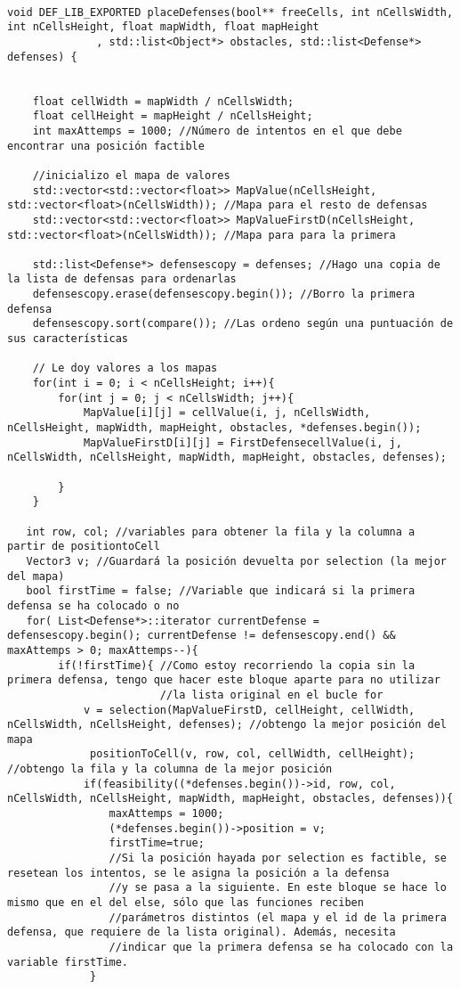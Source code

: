 \begin{lstlisting}

void DEF_LIB_EXPORTED placeDefenses(bool** freeCells, int nCellsWidth, int nCellsHeight, float mapWidth, float mapHeight
              , std::list<Object*> obstacles, std::list<Defense*> defenses) {

   
    float cellWidth = mapWidth / nCellsWidth;
    float cellHeight = mapHeight / nCellsHeight; 
    int maxAttemps = 1000; //Número de intentos en el que debe encontrar una posición factible
   
    //inicializo el mapa de valores
    std::vector<std::vector<float>> MapValue(nCellsHeight, std::vector<float>(nCellsWidth)); //Mapa para el resto de defensas
    std::vector<std::vector<float>> MapValueFirstD(nCellsHeight, std::vector<float>(nCellsWidth)); //Mapa para para la primera

    std::list<Defense*> defensescopy = defenses; //Hago una copia de la lista de defensas para ordenarlas
    defensescopy.erase(defensescopy.begin()); //Borro la primera defensa
    defensescopy.sort(compare()); //Las ordeno según una puntuación de sus características

    // Le doy valores a los mapas
    for(int i = 0; i < nCellsHeight; i++){
        for(int j = 0; j < nCellsWidth; j++){
            MapValue[i][j] = cellValue(i, j, nCellsWidth, nCellsHeight, mapWidth, mapHeight, obstacles, *defenses.begin());
            MapValueFirstD[i][j] = FirstDefensecellValue(i, j, nCellsWidth, nCellsHeight, mapWidth, mapHeight, obstacles, defenses);
           
        }
    }
    
   int row, col; //variables para obtener la fila y la columna a partir de positiontoCell
   Vector3 v; //Guardará la posición devuelta por selection (la mejor del mapa)
   bool firstTime = false; //Variable que indicará si la primera defensa se ha colocado o no
   for( List<Defense*>::iterator currentDefense = defensescopy.begin(); currentDefense != defensescopy.end() && maxAttemps > 0; maxAttemps--){
        if(!firstTime){ //Como estoy recorriendo la copia sin la primera defensa, tengo que hacer este bloque aparte para no utilizar
                        //la lista original en el bucle for
            v = selection(MapValueFirstD, cellHeight, cellWidth, nCellsWidth, nCellsHeight, defenses); //obtengo la mejor posición del mapa
             positionToCell(v, row, col, cellWidth, cellHeight); //obtengo la fila y la columna de la mejor posición
            if(feasibility((*defenses.begin())->id, row, col, nCellsWidth, nCellsHeight, mapWidth, mapHeight, obstacles, defenses)){
                maxAttemps = 1000;
                (*defenses.begin())->position = v;
                firstTime=true;
                //Si la posición hayada por selection es factible, se resetean los intentos, se le asigna la posición a la defensa
                //y se pasa a la siguiente. En este bloque se hace lo mismo que en el del else, sólo que las funciones reciben
                //parámetros distintos (el mapa y el id de la primera defensa, que requiere de la lista original). Además, necesita
                //indicar que la primera defensa se ha colocado con la variable firstTime.
             } 
           

\end{lstlisting}
